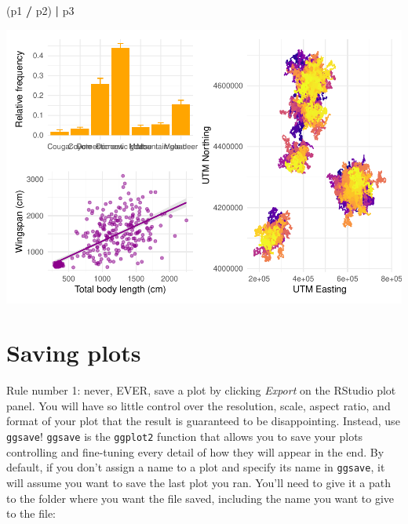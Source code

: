 \documentclass[
]{book}
\newenvironment{Shaded}{\begin{snugshade}}{\end{snugshade}}
\newcommand{\NormalTok}[1]{#1}
\newcommand{\SpecialCharTok}[1]{\textcolor[rgb]{0.81,0.36,0.00}{\textbf{#1}}}
\begin{document}
\begin{Shaded}
\begin{Highlighting}[]
\NormalTok{(p1 }\SpecialCharTok{/}\NormalTok{ p2) }\SpecialCharTok{|}\NormalTok{ p3}
\end{Highlighting}
\end{Shaded}

\includegraphics{reproducible-science_files/figure-latex/gg38-3.pdf}

\hypertarget{saving-plots}{%
\section{Saving plots}\label{saving-plots}}

Rule number 1: never, EVER, save a plot by clicking \emph{Export} on the RStudio plot
panel. You will have so little control over the resolution, scale, aspect ratio,
and format of your plot that the result is guaranteed to be disappointing.
Instead, use \texttt{ggsave}! \texttt{ggsave} is the \texttt{ggplot2} function that allows you to
save your plots controlling and fine-tuning every detail of how they will appear
in the end. By default, if you don't assign a name to a plot and specify its
name in \texttt{ggsave}, it will assume you want to save the last plot you ran. You'll
need to give it a path to the folder where you want the file saved, including
the name you want to give to the file:
\end{document}
